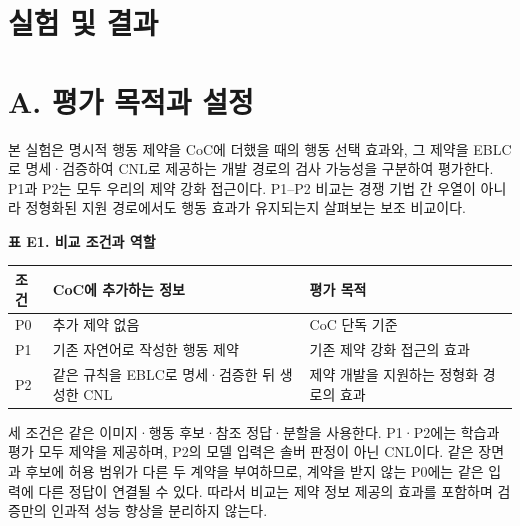 \documentclass[11pt,a4paper]{article}
\begin{document}
\section*{실험 및 결과}

\section*{A. 평가 목적과 설정}

본 실험은 명시적 행동 제약을 CoC에 더했을 때의 행동 선택 효과와, 그 제약을 EBLC로 명세·검증하여 CNL로 제공하는 개발 경로의 검사 가능성을 구분하여 평가한다. P1과 P2는 모두 우리의 제약 강화 접근이다. P1–P2 비교는 경쟁 기법 간 우열이 아니라 정형화된 지원 경로에서도 행동 효과가 유지되는지 살펴보는 보조 비교이다.\par

\par\smallskip\noindent\begin{minipage}{\linewidth}
\textbf{표 E1. 비교 조건과 역할}\par

\par\smallskip\noindent\begin{minipage}{\linewidth}\small
\begin{tabular}{@{}>{\raggedright\arraybackslash}p{}>{\raggedright\arraybackslash}p{}>{\raggedright\arraybackslash}p{}@{}}
\toprule
\textbf{조건} & \textbf{CoC에 추가하는 정보} & \textbf{평가 목적} \\
\midrule
P0 & 추가 제약 없음 & CoC 단독 기준 \\
P1 & 기존 자연어로 작성한 행동 제약 & 기존 제약 강화 접근의 효과 \\
P2 & 같은 규칙을 EBLC로 명세·검증한 뒤 생성한 CNL & 제약 개발을 지원하는 정형화 경로의 효과 \\
\bottomrule\end{tabular}\end{minipage}\par\smallskip
\end{minipage}\par\smallskip

세 조건은 같은 이미지·행동 후보·참조 정답·분할을 사용한다. P1·P2에는 학습과 평가 모두 제약을 제공하며, P2의 모델 입력은 솔버 판정이 아닌 CNL이다. 같은 장면과 후보에 허용 범위가 다른 두 계약을 부여하므로, 계약을 받지 않는 P0에는 같은 입력에 다른 정답이 연결될 수 있다. 따라서 비교는 제약 정보 제공의 효과를 포함하며 검증만의 인과적 성능 향상을 분리하지 않는다.\par
\end{document}
